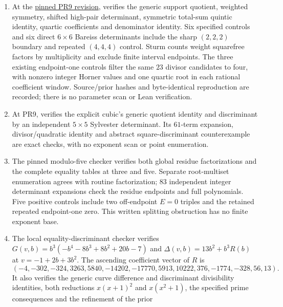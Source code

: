 \begin{enumerate}
independent integer-Horner and $6\times6$ Bareiss evaluations in every
case. The complete CSV and JSON reproduce byte-for-byte. Seven direct
quotient/Horner/Sturm fixtures and the repeated control supplement the
proof; earlier minimum-through-seven certificates remain dependencies.
\item At the
\href{https://github.com/the-omega-institute/ideal-intersection-laplacian/blob/4a451ac51055c6d04926967749196f12ac8e49c8/scripts/check_total_sum_spectral_gap.py}{pinned PR9 revision},
 verifies the generic support
quotient, weighted symmetry, shifted high-pair determinant, symmetric
total-sum quintic identity, quartic coefficients and denominator identity.
Six specified controls and six direct $6\times6$ Bareiss determinants
include the sharp $(2,2,2)$ boundary and repeated $(4,4,4)$ control.
Sturm counts weight squarefree factors by multiplicity and exclude finite
interval endpoints. The three existing endpoint-one controls filter the
same $23$ divisor candidates to four, with nonzero integer Horner values
and one quartic root in each rational coefficient window.
Source/prior hashes and byte-identical reproduction are recorded;
there is no parameter scan or Lean verification.
\item At PR9,  verifies
the explicit cubic's generic quotient identity and discriminant by an
independent $5\times5$ Sylvester determinant. Its $61$-term expansion,
divisor/quadratic identity and abstract square-discriminant counterexample
are exact checks, with no exponent scan or point enumeration.
\item The pinned modulo-five checker verifies both global residue
factorizations and the complete equality tables at three and five.
Separate root-multiset enumeration agrees with routine factorization;
$83$ independent integer determinant expansions check the residue
endpoints and full polynomials. Five positive controls include two
off-endpoint $E=0$ triples and the retained repeated endpoint-one zero.
This written splitting obstruction has no finite exponent base.
\item The local equality-discriminant checker verifies
$G(v,b)=b^3(-b^4-8b^3+8b^2+20b-7)$ and
$\Delta(v,b)=13b^2+b^3R(b)$ at $v=-1+2b+3b^2$. The ascending
coefficient vector of $R$ is
\[
 (-4,-302,-324,3263,5840,-14202,-17770,
 5913,10222,376,-1774,-328,56,13).
\]
It also verifies the generic curve difference and discriminant
divisibility identities, both reductions $x(x+1)^2$ and $x(x^2+1)$,
the specified prime consequences and the refinement of the prior

\end{enumerate}
